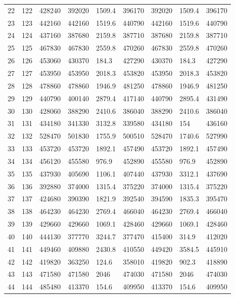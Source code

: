 \begin{tabular}{lllllllll}
22 & 122 & 428240 & 392020 & 1509.4 & 396170 & 392020 & 1509.4 & 396170 \\ 
23 & 123 & 442160 & 442160 & 1519.6 & 440790 & 442160 & 1519.6 & 440790 \\ 
24 & 124 & 437160 & 387680 & 2159.8 & 387710 & 387680 & 2159.8 & 387710 \\ 
25 & 125 & 467830 & 467830 & 2559.8 & 470260 & 467830 & 2559.8 & 470260 \\ 
26 & 126 & 453060 & 430370 & 184.3 & 427290 & 430370 & 184.3 & 427290 \\ 
27 & 127 & 453950 & 453950 & 2018.3 & 453820 & 453950 & 2018.3 & 453820 \\ 
28 & 128 & 478860 & 478860 & 1946.9 & 481250 & 478860 & 1946.9 & 481250 \\ 
29 & 129 & 440790 & 400140 & 2879.4 & 417140 & 440790 & 2895.4 & 431490 \\ 
30 & 130 & 428060 & 388290 & 2410.6 & 386040 & 388290 & 2410.6 & 386040 \\ 
31 & 131 & 434180 & 341330 & 3132.8 & 339580 & 434180 & 154 & 436160 \\ 
32 & 132 & 528470 & 501830 & 1755.9 & 500510 & 528470 & 1740.6 & 527990 \\ 
33 & 133 & 453720 & 453720 & 1892.1 & 457490 & 453720 & 1892.1 & 457490 \\ 
34 & 134 & 456120 & 455580 & 976.9 & 452890 & 455580 & 976.9 & 452890 \\ 
35 & 135 & 437930 & 405690 & 1106.1 & 407440 & 437930 & 3312.1 & 437690 \\ 
36 & 136 & 392880 & 374000 & 1315.4 & 375220 & 374000 & 1315.4 & 375220 \\ 
37 & 137 & 424680 & 390390 & 1821.9 & 392540 & 394590 & 1835.3 & 395470 \\ 
38 & 138 & 464230 & 464230 & 2769.4 & 466040 & 464230 & 2769.4 & 466040 \\ 
39 & 139 & 429660 & 429660 & 1069.1 & 428460 & 429660 & 1069.1 & 428460 \\ 
40 & 140 & 444130 & 377770 & 3244.7 & 377470 & 415400 & 314.9 & 412020 \\ 
41 & 141 & 449460 & 409880 & 2430.8 & 410550 & 449420 & 3584.5 & 445910 \\ 
42 & 142 & 419820 & 363250 & 124.6 & 358010 & 419820 & 902.3 & 418890 \\ 
43 & 143 & 471580 & 471580 & 2046 & 474030 & 471580 & 2046 & 474030 \\ 
44 & 144 & 485480 & 413370 & 154.6 & 409950 & 413370 & 154.6 & 409950 \\ 

\end{tabular}
